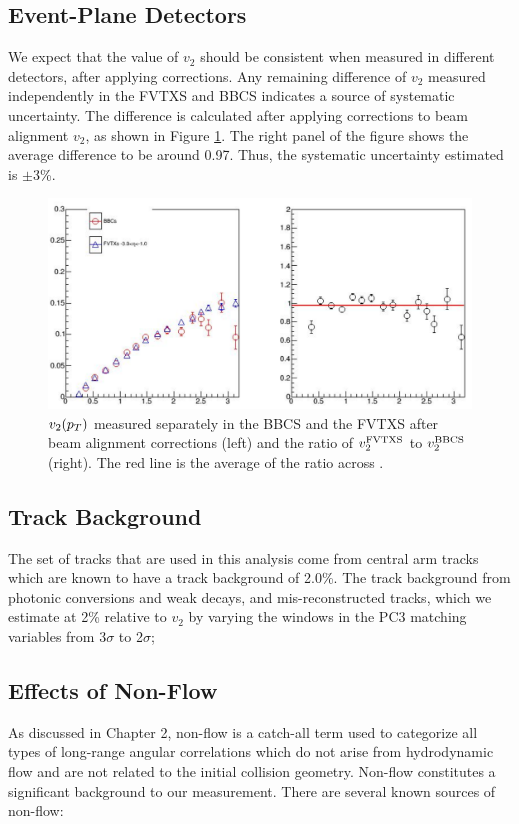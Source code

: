 \subsection{Event-Plane Detectors}
We expect that the value of $v_2$ should be consistent when measured in different detectors, after applying corrections. Any remaining difference of $v_2$ measured independently in the FVTXS and BBCS indicates a source of systematic uncertainty. The difference is calculated after applying corrections to beam alignment $v_2$, as shown in Figure \ref{fig:v2_fvtx_bbc_compare}. The right panel of the figure shows the average difference to be around 0.97. Thus, the systematic uncertainty estimated is $\pm$3\%.
\begin{figure}[!h]
\begin{center}
\includegraphics[width=0.6\linewidth]{figs/v2_fvtx_bbc_compare_w_correction.png}
\caption{$v_2(\mbox{$p_T$})$ measured separately in the BBCS and the FVTXS after beam alignment corrections (left) and the ratio of $v_2^{\rm FVTXS}$ to $v_2^{\rm BBCS}$ (right). The red line is the average of the ratio across \pt.}
\label{fig:v2_fvtx_bbc_compare}
\end{center}
\end{figure}

\subsection{Track Background}
The set of tracks that are used in this analysis come from central arm tracks which are known to have a track background of 2.0\%. The track background from photonic conversions and weak decays, and mis-reconstructed tracks, which we estimate at 2\% relative to $v_2$ by varying the windows in the PC3 matching variables from 3$\sigma$ to 2$\sigma$;
\subsection{Effects of Non-Flow}
\label{sec:non_flow_intro}
As discussed in Chapter 2, non-flow is a catch-all term used to categorize all types of long-range angular correlations which do not arise from hydrodynamic flow and are not related to the initial collision geometry. Non-flow constitutes a significant background to our measurement. There are several known sources of non-flow:

